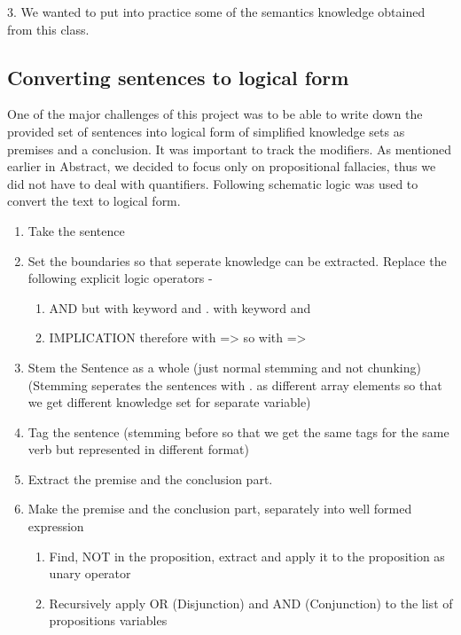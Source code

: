 \documentclass[14pt, english]{article}
\begin{document}
3. We wanted to put into practice some of the semantics knowledge
obtained from this class.


\subsection{Converting sentences to logical form}

One of the major challenges of this project was to be able to write
down the provided set of sentences into logical form of simplified
knowledge sets as premises and a conclusion. It was important to track
the modifiers. As mentioned earlier in Abstract, we decided to focus
only on propositional fallacies, thus we did not have to deal with
quantifiers. Following schematic logic was used to convert the text
to logical form.
\begin{enumerate}
\item Take the sentence 
\item Set the boundaries so that seperate knowledge can be extracted. Replace
the following explicit logic operators -

\begin{enumerate}
\item AND \textquotedbl{}but\textquotedbl{} with keyword \textquotedbl{}and\textquotedbl{}
\textquotedbl{}.\textquotedbl{} with keyword \textquotedbl{}and\textquotedbl{} 
\item IMPLICATION \textquotedbl{}therefore\textquotedbl{} with \textquotedbl{}=>\textquotedbl{}
\textquotedbl{}so\textquotedbl{} with \textquotedbl{}=>\textquotedbl{} 
\end{enumerate}
\item Stem the Sentence as a whole (just normal stemming and not chunking)
(Stemming seperates the sentences with \textquotedbl{}.\textquotedbl{}
as different array elements so that we get different knowledge set
for separate variable) 
\item Tag the sentence (stemming before so that we get the same tags for
the same verb but represented in different format) 
\item Extract the premise and the conclusion part. 
\item Make the premise and the conclusion part, separately into well formed
expression 

\begin{enumerate}
\item Find, NOT in the proposition, extract and apply it to the proposition
as unary operator 
\item Recursively apply OR (Disjunction) and AND (Conjunction) to the list
of propositions variables 
\end{enumerate}
\end{enumerate}
\end{document}
